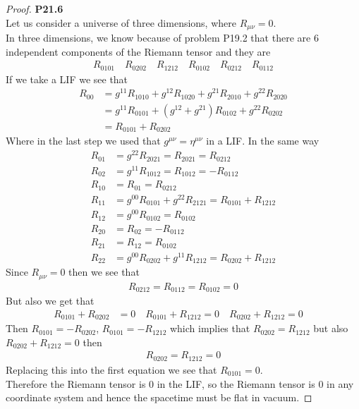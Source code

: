\documentclass[11pt]{article}
\theoremstyle{definition}
\begin{document}
\cleardoublepage
\begin{proof}{\textbf{P21.6}}\\
Let us consider a universe of three dimensions, where $R_{\mu\nu} = 0$.\\
In three dimensions, we know because of problem P19.2 that there are 6
independent components of the Riemann tensor and they are
\begin{align*}
    R_{0101}\quad R_{0202}\quad R_{1212}\quad
    R_{0102}\quad R_{0212}\quad R_{0112}
\end{align*}
If we take a LIF we see that
\begin{align*}
    R_{00} 
    &= g^{11}R_{1010} + g^{12}R_{1020} + g^{21}R_{2010} + g^{22}R_{2020} \\
    &= g^{11}R_{0101} + (g^{12}+ g^{21}) R_{0102} + g^{22}R_{0202} \\
    &= R_{0101} + R_{0202}
\end{align*}
Where in the last step we used that $g^{\mu\nu} = \eta^{\mu\nu}$ in a LIF.
In the same way
\begin{align*}
    R_{01} &= g^{22}R_{2021} = R_{2021} = R_{0212} \\
    R_{02} &= g^{11}R_{1012} = R_{1012} = -R_{0112} \\
    R_{10} &= R_{01} = R_{0212} \\
    R_{11} &= g^{00}R_{0101} + g^{22}R_{2121} = R_{0101} + R_{1212} \\
    R_{12} &= g^{00}R_{0102} = R_{0102}\\
    R_{20} &= R_{02} = -R_{0112}\\
    R_{21} &= R_{12} = R_{0102}\\
    R_{22} &= g^{00}R_{0202} + g^{11}R_{1212} = R_{0202} + R_{1212}
\end{align*}
Since $R_{\mu\nu} = 0$ then we see that
\begin{align*}
    R_{0212} = R_{0112} = R_{0102} = 0
\end{align*}
But also we get that
\begin{align*}
    R_{0101} + R_{0202} &= 0 \quad
    R_{0101} + R_{1212} = 0 \quad
    R_{0202} + R_{1212} = 0 \quad
\end{align*}
Then $R_{0101} = -R_{0202}$, $R_{0101} = -R_{1212}$  which implies that
$R_{0202} = R_{1212}$ but also $R_{0202} + R_{1212} = 0$ then
\begin{align*}
    R_{0202} = R_{1212} = 0
\end{align*}
Replacing this into the first equation we see that $R_{0101} = 0$.\\
Therefore the Riemann tensor is 0 in the LIF, so the Riemann tensor is 0 in
any coordinate system and hence the spacetime must be flat in vacuum.
\end{proof}
\end{document}
